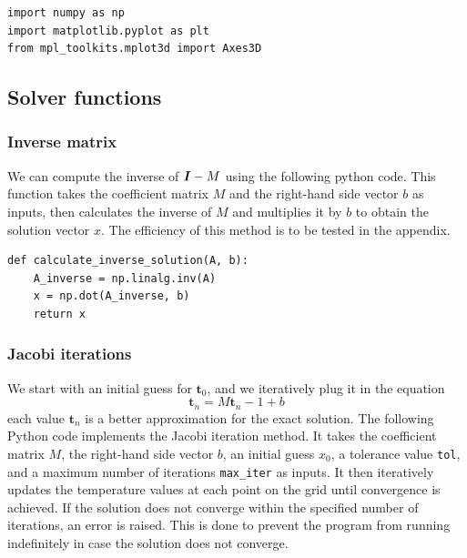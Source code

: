 \documentclass{article}
\begin{document}
\begin{lstlisting}[style=Python]
import numpy as np
import matplotlib.pyplot as plt
from mpl_toolkits.mplot3d import Axes3D
\end{lstlisting}

\begin{multicols}{2}
\subsection{Solver functions}
\subsubsection{Inverse matrix}
We can compute the inverse of $\textbf{\textit{I}} - M$ using the following
python code. This function takes the coefficient matrix $M$ and the right-hand
side vector $b$ as inputs, then calculates the inverse of $M$ and multiplies it
by $b$ to obtain the solution vector $x$. The efficiency of this method is to be
tested in the appendix.
\end{multicols}
\begin{lstlisting}[style=Python]
def calculate_inverse_solution(A, b):
    A_inverse = np.linalg.inv(A)
    x = np.dot(A_inverse, b)
    return x
\end{lstlisting}

\begin{multicols}{2}
\subsubsection{Jacobi iterations}
We start with an initial guess for $\textbf{t}_0$, and we iteratively plug it in the equation
\begin{equation}
  \textbf{t}_n = M \textbf{t}_n-1 + b
\end{equation}
each value $\textbf{t}_n$ is a better approximation for the exact solution.
The following Python code implements the Jacobi iteration method. It takes the
coefficient matrix $M$, the right-hand side vector $b$, an initial guess $x_0$,
a tolerance value \texttt{tol}, and a maximum number of iterations \texttt{max\_iter} as
inputs. It then iteratively updates the temperature values at each point on the
grid until convergence is achieved. If the solution does not converge within the
specified number of iterations, an error is raised. This is done to prevent the
program from running indefinitely in case the solution does not converge.
\end{multicols}
\end{document}
